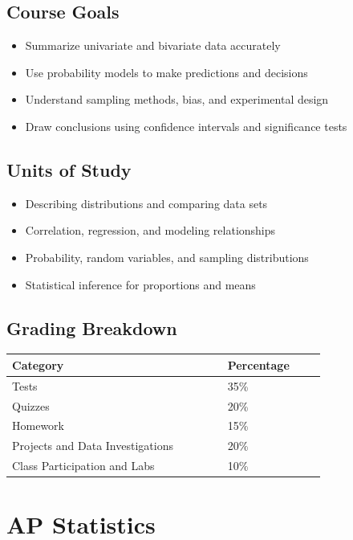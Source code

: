 \documentclass[12pt,oneside]{book}
\begin{document}
\section{Course Goals}
\begin{itemize}[leftmargin=2em]
    \item Summarize univariate and bivariate data accurately
    \item Use probability models to make predictions and decisions
    \item Understand sampling methods, bias, and experimental design
    \item Draw conclusions using confidence intervals and significance tests
\end{itemize}

\section{Units of Study}
\begin{itemize}[leftmargin=2em]
    \item Describing distributions and comparing data sets
    \item Correlation, regression, and modeling relationships
    \item Probability, random variables, and sampling distributions
    \item Statistical inference for proportions and means
\end{itemize}

\section{Grading Breakdown}
\begin{center}
\begin{tabular}{L{0.55\linewidth}L{0.25\linewidth}}
\toprule
\textbf{Category} & \textbf{Percentage} \\
\midrule
Tests & 35\% \\
Quizzes & 20\% \\
Homework & 15\% \\
Projects and Data Investigations & 20\% \\
Class Participation and Labs & 10\% \\
\bottomrule
\end{tabular}
\end{center}

\chapter{AP Statistics}
\end{document}
